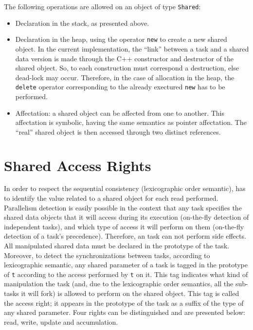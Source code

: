 The following operations are allowed on an object of type \verb!Shared!:
\begin{itemize}
\item Declaration in the stack, as presented above.
\item Declaration in the heap, using the operator \verb!new! to create a new shared object. In the current implementation, 
the ``link'' between a task and a shared data version is made through the C++ constructor and destructor of the 
shared object. So, to each construction must correspond a destruction, else dead-lock may occur. Therefore, in the case 
of allocation in the heap, the \verb!delete! operator corresponding to the already exectured \verb!new! has to be performed. 
\item Affectation: a shared object can be affected from one to another. This affectation is symbolic, having the same semantics 
as pointer affectation.  The ``real'' shared object is then accessed through two distinct references. 
\end{itemize}

\section{Shared Access Rights}\label{sec:shd_rights}

In order to respect the sequential consistency (lexicographic order semantic), \kaapi  has to identify 
the value related to a shared object for each read performed. Parallelism detection is easily possible in 
the context that any task specifies the shared data objects that it will access during its execution 
(on-the-fly detection of independent tasks), and which type of access it will perform on them (on-the-fly detection 
of a task's precedence). Therefore, an \kaapi  task can not perform side effects.  All manipulated shared data must 
be declared in the prototype of the task. Moreover, to detect the synchronizations between tasks, according to lexicographic 
semantic, any shared parameter of a task is tagged in the prototype of \verb!t! according to the access performed by \verb!t! on it.  
This tag indicates what kind of manipulation the task (and, due to the lexicographic order semantics, all the sub-tasks 
it will fork) is allowed to perform on the shared object. This tag is called the access right; it appears in the 
prototype of the task as a suffix of the type of any shared parameter. Four rights can be distinguished and are presented 
below: read, write, update and accumulation. 


